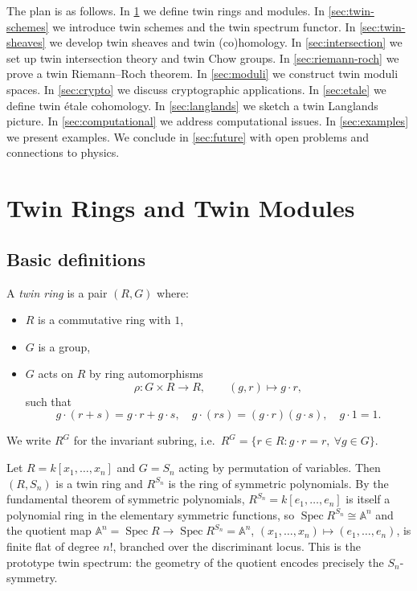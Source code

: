 \documentclass[11pt,a4paper]{article}
\numberwithin{equation}{section}
\DeclareMathOperator{\Spec}{Spec}
\begin{document}
	The plan is as follows.
	In \cref{sec:twin-rings} we define twin rings and modules.
	In \cref{sec:twin-schemes} we introduce twin schemes and the twin spectrum functor.
	In \cref{sec:twin-sheaves} we develop twin sheaves and twin (co)homology.
	In \cref{sec:intersection} we set up twin intersection theory and twin Chow groups.
	In \cref{sec:riemann-roch} we prove a twin Riemann--Roch theorem.
	In \cref{sec:moduli} we construct twin moduli spaces.
	In \cref{sec:crypto} we discuss cryptographic applications.
	In \cref{sec:etale} we define twin \'etale cohomology.
	In \cref{sec:langlands} we sketch a twin Langlands picture.
	In \cref{sec:computational} we address computational issues.
	In \cref{sec:examples} we present examples.
	We conclude in \cref{sec:future} with open problems and connections to physics.
	
	\section{Twin Rings and Twin Modules}
	\label{sec:twin-rings}
	
	\subsection{Basic definitions}
	
	\begin{definition}
		A \emph{twin ring} is a pair $(R,G)$ where:
		\begin{itemize}
			\item $R$ is a commutative ring with $1$,
			\item $G$ is a group,
			\item $G$ acts on $R$ by ring automorphisms
			\[
			\rho:G\times R\to R,\qquad (g,r)\mapsto g\cdot r,
			\]
			such that
			\[
			g\cdot(r+s)=g\cdot r+g\cdot s,\quad
			g\cdot(rs)=(g\cdot r)(g\cdot s),\quad
			g\cdot 1=1.
			\]
		\end{itemize}
	\end{definition}
	
	We write $R^G$ for the invariant subring, i.e.\ $R^G=\{r\in R : g\cdot r=r,\ \forall g\in G\}$.
	
	\begin{example}
		Let $R=k[x_1,\dots,x_n]$ and $G=S_n$ acting by permutation of variables.
		Then $(R,S_n)$ is a twin ring and $R^{S_n}$ is the ring of symmetric polynomials. By the fundamental theorem of
		symmetric polynomials, $R^{S_n}=k[e_1,\dots,e_n]$ is itself a polynomial ring in the elementary symmetric
		functions, so $\Spec R^{S_n}\cong\mathbb A^n$ and the quotient map
		$\mathbb A^n=\Spec R\to\Spec R^{S_n}=\mathbb A^n$, $(x_1,\dots,x_n)\mapsto(e_1,\dots,e_n)$, is finite flat of
		degree $n!$, branched over the discriminant locus. This is the prototype twin spectrum: the geometry of the
		quotient encodes precisely the $S_n$-symmetry.
	\end{example}
	
\end{document}
